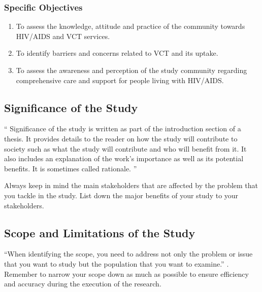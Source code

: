 \documentclass{strrespaper-trad}
\begin{document}
			\subsubsection{Specific Objectives}
				\begin{enumerate}
					\item To assess the knowledge, attitude and practice of the community towards HIV/AIDS and VCT services.
					\item To identify barriers and concerns related to VCT and its uptake.
					\item To assess the awareness and perception of the study community regarding comprehensive care and support for people living with HIV/AIDS.
				\end{enumerate}

		\subsection{Significance of the Study}
			\enquote{%
				Significance of the study is written as part of the introduction section of a thesis.
				It provides details to the reader on how the study will contribute to society such as what the study will contribute and who will benefit from it.
				It also includes an explanation of the work’s importance as well as its potential benefits.
				It is sometimes called rationale.%
			} \autocite{WritingThesisSignificance2016}

			Always keep in mind the main stakeholders that are affected by the problem that you tackle in the study.
			List down the major benefits of your study to your stakeholders.

		\subsection{Scope and Limitations of the Study}
			\enquote{When identifying the scope, you need to address not only the problem or issue that you want to study but the population that you want to examine.} \autocite{askmediagroupWhatAreScope2020}. Remember to narrow your scope down as much as possible to ensure efficiency and accuracy during the execution of the research.
\end{document}
